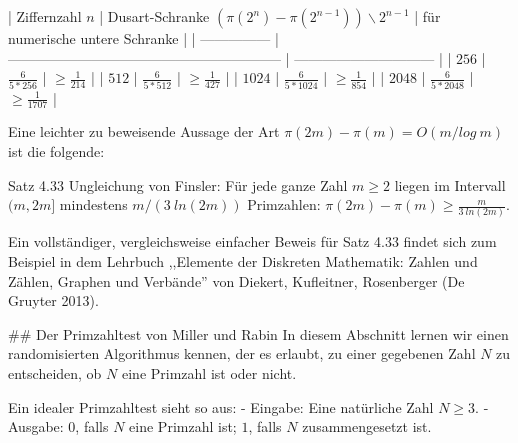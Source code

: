 \documentclass[a4paper]{article}
\begin{document}
\begin{multicols}{3}
{        | Ziffernzahl $n$ | Dusart-Schranke $(\pi(2^n)-\pi(2^{n-1}))\backslash 2^{n-1}$ | für numerische untere Schranke |
        | --------------- | ----------------------------------------------------------- | ------------------------------ |
        | $256$           | $\frac{6}{5*256}$                                           | $\geq \frac{1}{214}$           |
        | $512$           | $\frac{6}{5*512}$                                           | $\geq \frac{1}{427}$           |
        | $1024$          | $\frac{6}{5*1024}$                                          | $\geq\frac{1}{854}$            |
        | $2048$          | $\frac{6}{5*2048}$                                          | $\geq\frac{1}{1707}$           |

        Eine leichter zu beweisende Aussage der Art $\pi(2m)-\pi(m) = O(m/log\ m)$ ist die folgende:

        Satz 4.33 Ungleichung von Finsler: Für jede ganze Zahl $m\geq 2$ liegen im Intervall $(m, 2m]$ mindestens $m/(3\ ln(2m))$ Primzahlen: $\pi (2m)-\pi(m)\geq \frac{m}{3\ ln(2m)}$.

        Ein vollständiger, vergleichsweise einfacher Beweis für Satz 4.33 findet sich zum Beispiel in dem Lehrbuch ,,Elemente der Diskreten Mathematik: Zahlen und Zählen, Graphen und Verbände'' von Diekert, Kufleitner, Rosenberger (De Gruyter 2013).

        ## Der Primzahltest von Miller und Rabin
        In diesem Abschnitt lernen wir einen randomisierten Algorithmus kennen, der es erlaubt, zu einer gegebenen Zahl $N$ zu entscheiden, ob $N$ eine Primzahl ist oder nicht.

        Ein idealer Primzahltest sieht so aus:
        - Eingabe: Eine natürliche Zahl $N\geq 3$.
        - Ausgabe: $0$, falls $N$ eine Primzahl ist; $1$, falls $N$ zusammengesetzt ist.

}
\end{multicols}
\end{document}
